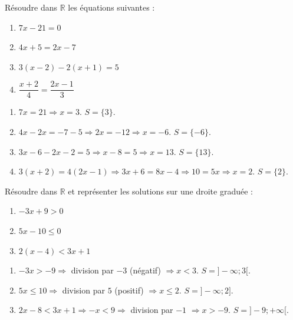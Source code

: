 \documentclass[11pt]{article}
\begin{document}
\begin{exercice}
Résoudre dans $\mathbb{R}$ les équations suivantes :
\begin{enumerate}
\item $7x - 21 = 0$
\item $4x + 5 = 2x - 7$
\item $3(x-2) - 2(x+1) = 5$
\item $\dfrac{x+2}{4} = \dfrac{2x-1}{3}$
\end{enumerate}
\end{exercice}

\begin{corrige}
\begin{enumerate}
\item $7x=21 \Rightarrow x=3$. $S=\{3\}$.
\item $4x-2x = -7-5 \Rightarrow 2x=-12 \Rightarrow x=-6$. $S=\{-6\}$.
\item $3x-6-2x-2=5 \Rightarrow x-8=5 \Rightarrow x=13$. $S=\{13\}$.
\item $3(x+2)=4(2x-1) \Rightarrow 3x+6=8x-4 \Rightarrow 10=5x \Rightarrow x=2$. $S=\{2\}$.
\end{enumerate}
\end{corrige}

\begin{exercice}
Résoudre dans $\mathbb{R}$ et représenter les solutions sur une droite graduée :
\begin{enumerate}
\item $-3x + 9 > 0$
\item $5x - 10 \leq 0$
\item $2(x-4) < 3x + 1$
\end{enumerate}
\end{exercice}

\begin{corrige}
\begin{enumerate}
\item $-3x > -9 \Rightarrow$ division par $-3$ (négatif) $\Rightarrow x < 3$. $S=]-\infty; 3[$.
\item $5x \leq 10 \Rightarrow$ division par $5$ (positif) $\Rightarrow x \leq 2$. $S=]-\infty; 2]$.
\item $2x-8 < 3x+1 \Rightarrow -x < 9 \Rightarrow$ division par $-1$ $\Rightarrow x > -9$. $S=]-9; +\infty[$.
\end{enumerate}
\end{corrige}
\end{document}
